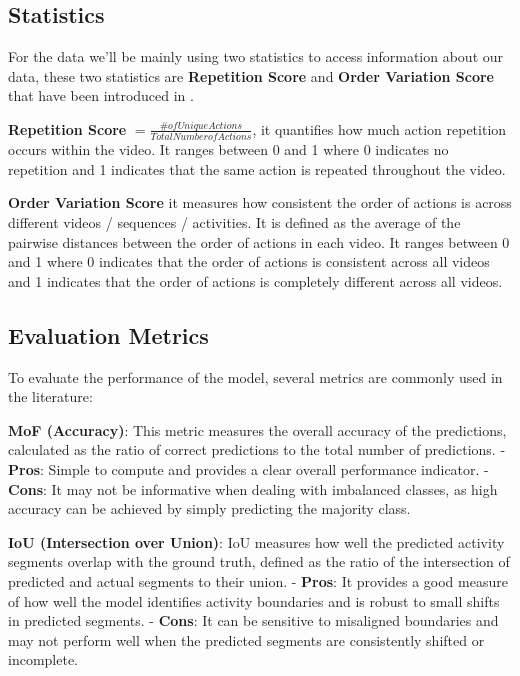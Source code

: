 \subsection{Statistics}

For the data we'll be mainly using two statistics to access information about our data, these two statistics are \textbf{Repetition Score} and \textbf{Order Variation Score} that have been introduced in \cite{tas-survey}.

\textbf{Repetition Score} $= \frac{\# of Unique Actions}{Total Number of Actions}$, it quantifies how much action repetition occurs within the video. It ranges between 0 and 1 where 0 indicates no repetition and 1 indicates that the same action is repeated throughout the video.

\textbf{Order Variation Score} it measures how consistent the order of actions is across different videos / sequences / activities. It is defined as the average of the pairwise distances between the order of actions in each video. It ranges between 0 and 1 where 0 indicates that the order of actions is consistent across all videos and 1 indicates that the order of actions is completely different across all videos.

\subsection{Evaluation Metrics}

To evaluate the performance of the model, several metrics are commonly used in the literature:

\textbf{MoF (Accuracy)}: This metric measures the overall accuracy of the predictions, calculated as the ratio of correct predictions to the total number of predictions. 
- \textbf{Pros}: Simple to compute and provides a clear overall performance indicator. 
- \textbf{Cons}: It may not be informative when dealing with imbalanced classes, as high accuracy can be achieved by simply predicting the majority class.

\textbf{IoU (Intersection over Union)}: IoU measures how well the predicted activity segments overlap with the ground truth, defined as the ratio of the intersection of predicted and actual segments to their union. 
- \textbf{Pros}: It provides a good measure of how well the model identifies activity boundaries and is robust to small shifts in predicted segments.
- \textbf{Cons}: It can be sensitive to misaligned boundaries and may not perform well when the predicted segments are consistently shifted or incomplete.

